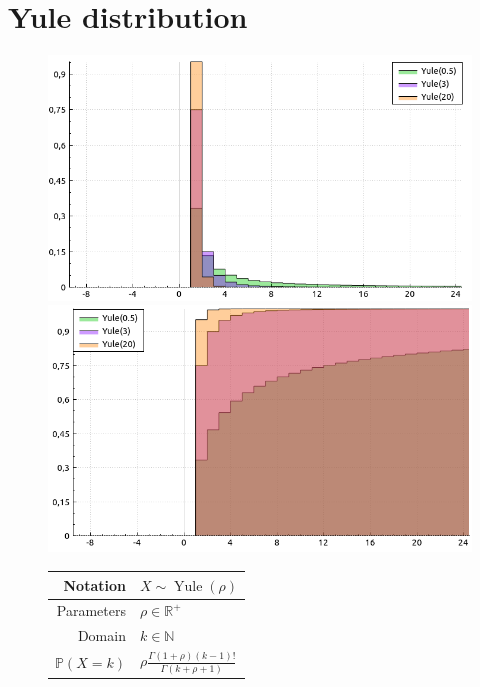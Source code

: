 \documentclass[a4paper,11pt]{article}
\theoremstyle{plain}
\theoremstyle{definition}
\newcommand{\MR}{\mathbb{R}}
\newcommand{\MP}{\mathbb{P}}
\newcommand{\MN}{\mathbb{N}}
\begin{document}
	\section{Yule distribution}
	\begin{figure}[!htb]\centering
		\begin{minipage}{0.55\textwidth}
			\includegraphics[width=\linewidth, right]{yule_pmf}
			\captionsetup{labelformat=empty}
			\includegraphics[width=\linewidth, right]{yule_cdf}
			\captionsetup{labelformat=empty}
		\end{minipage}
		\begin{minipage}{0.4\textwidth}
			\begin{tabular}{| r | l |}
				\hline
				Notation & $ X \sim \operatorname{Yule}(\rho) $ \\
				\hline
				Parameters & $\rho \in \MR^+$ \\
				\hline
				Domain & $ k \in \MN $  \\
				\hline
				$\MP(X = k)$ & $\rho \frac{ \Gamma(1+\rho) (k-1)! } {\Gamma(k+\rho+1)} $ \\

\end{tabular}
\end{minipage}
\end{figure}
\end{document}

